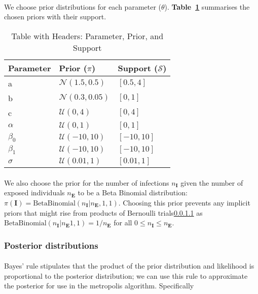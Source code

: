 \documentclass{article}
\begin{document}
\paragraph{}We choose prior distributions for each parameter \pi($\theta$). \textbf{Table~\ref{tab:priorsA}} summarises the chosen priors with their support. 

\begin{table}[ht]
    \centering
    \begin{tabular}{|l|l|l|}
        \hline
        \textbf{Parameter} & \textbf{Prior ($\pi$)} & \textbf{Support ($\mathcal{S}$)} \\
        \hline
        a & $\mathcal{N}(1.5, 0.5)$ & $[0.5, 4]$ \\
        \hline
        b & $\mathcal{N}(0.3, 0.05)$ & $[0, 1]$ \\
        \hline
        c & $\mathcal{U}(0, 4)$ & $[0, 4]$ \\
        \hline
        $\alpha$ & $\mathcal{U}(0, 1)$ & $[0, 1]$ \\
        \hline
        $\beta_0$ & $\mathcal{U}(-10, 10)$ & $[-10, 10]$ \\
        \hline
        $\beta_1$ & $\mathcal{U}(-10, 10)$ & $[-10, 10]$ \\
        \hline
        $\sigma$ &  $\mathcal{U}(0.01, 1)$ & $[0.01, 1]$ \\
        \hline
    \end{tabular}
    \caption{Table with Headers: Parameter, Prior, and Support}
    \label{tab:priorsA}
\end{table}

\paragraph{}We also choose the prior for the number of infections $n_\mathbf{I}$ given the number of exposed individuals $n_\mathbf{E}$ to be a Beta Binomial distribution: $\pi(\mathbf{I}) = \text{BetaBinomial}(n_\mathbf{I} | n_\mathbf{E}, 1, 1)$. Choosing this prior prevents any implicit priors that might rise from products of Bernoulli trials\ref{} as $\text{BetaBinomial}(n_\mathbf{I} | n_\mathbf{E} 1, 1) = 1 / n_\mathbf{E}$ for all $0 \leq n_\mathbf{I} \leq n_\mathbf{E}$. 


\subsubsection{Posterior distributions}

\paragraph{}Bayes' rule stipulates that the product of the prior distribution and likelihood is proportional to the posterior distribution; we can use this rule to approximate the posterior for use in the metropolis algorithm. Specifically 
\end{document}
